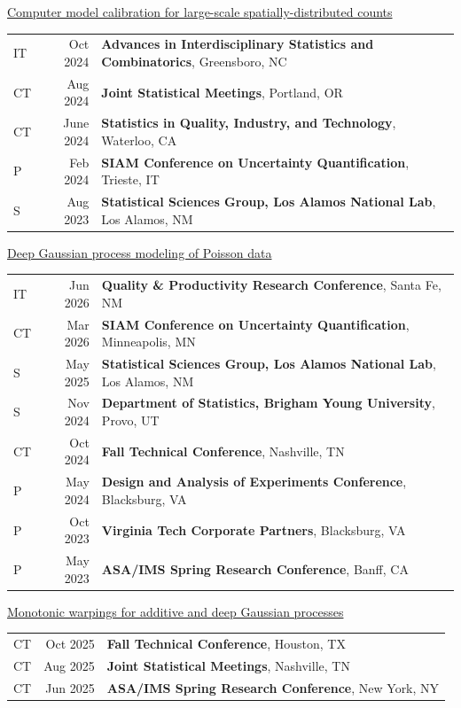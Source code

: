 \documentclass[margin,line]{res}
\begin{document}
\begin{resume}
\underline{Computer model calibration for large-scale spatially-distributed counts}\\
\begin{tabular}{lrl}
IT\quad\quad & Oct 2024 & {\bf Advances in Interdisciplinary Statistics and Combinatorics}, Greensboro, NC \\
CT\quad\quad & Aug 2024 & {\bf Joint Statistical Meetings}, Portland, OR \\
CT\quad\quad & June 2024 & {\bf Statistics in Quality, Industry, and Technology}, Waterloo, CA \\
P\quad\quad & Feb 2024 & {\bf SIAM Conference on Uncertainty Quantification}, Trieste, IT \\
S\quad\quad & Aug 2023 & {\bf Statistical Sciences Group, Los Alamos National Lab}, Los Alamos, NM \\
\end{tabular}

\underline{Deep Gaussian process modeling of Poisson data}\\
\begin{tabular}{lrl}
IT\quad\quad & Jun 2026 & {\bf Quality \& Productivity Research Conference}, Santa Fe, NM \\
CT\quad\quad & Mar 2026 & {\bf SIAM Conference on Uncertainty Quantification}, Minneapolis, MN \\
S\quad\quad & May 2025 & {\bf Statistical Sciences Group, Los Alamos National Lab}, Los Alamos, NM \\
S\quad\quad & Nov 2024 & {\bf Department of Statistics, Brigham Young University}, Provo, UT \\
CT\quad\quad & Oct 2024 & {\bf Fall Technical Conference}, Nashville, TN \\
P\quad\quad & May 2024 & {\bf Design and Analysis of Experiments Conference}, Blacksburg, VA \\
P\quad\quad & Oct 2023 & {\bf Virginia Tech Corporate Partners}, Blacksburg, VA \\
P\quad\quad & May 2023 & {\bf ASA/IMS Spring Research Conference}, Banff, CA \\
\end{tabular}

\underline{Monotonic warpings for additive and deep Gaussian processes}\\
\begin{tabular}{lrl}
CT\quad\quad & Oct 2025 & {\bf Fall Technical Conference}, Houston, TX \\
CT\quad\quad & Aug 2025 & {\bf Joint Statistical Meetings}, Nashville, TN \\
CT\quad\quad & Jun 2025 & {\bf ASA/IMS Spring Research Conference}, New York, NY \\
\end{tabular}


\end{resume}
\end{document}
